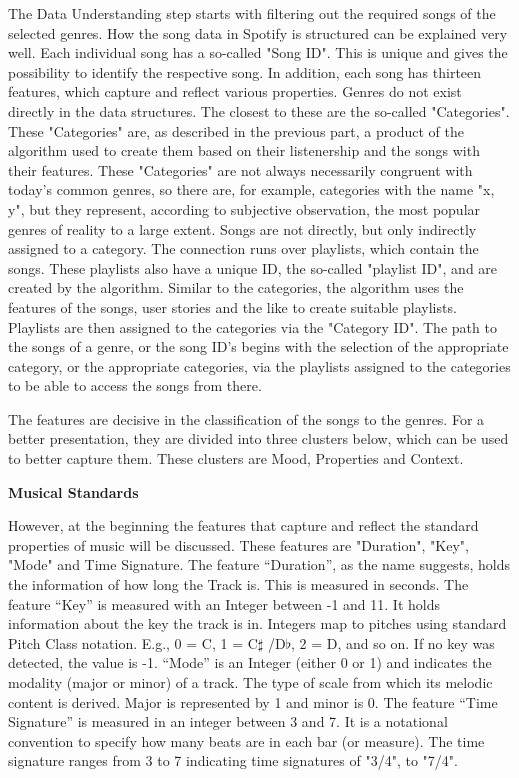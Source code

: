 The Data Understanding step starts with filtering out the required songs of the selected genres. 
How the song data in Spotify is structured can be explained very well.
Each individual song has a so-called "Song ID". 
This is unique and gives the possibility to identify the respective song.
In addition, each song has thirteen features, which capture and reflect various properties. 
Genres do not exist directly in the data structures. The closest to these are the so-called "Categories". 
These "Categories" are, as described in the previous part, a product of the algorithm used
to create them based on their listenership and the songs with their features. 
These "Categories" are not always necessarily congruent with today's common genres,
so there are, for example, categories with the name "x, y", but they represent, 
according to subjective observation, the most popular genres of reality to a large extent.
Songs are not directly, but only indirectly assigned to a category. 
The connection runs over playlists, which contain the songs.
These playlists also have a unique ID, the so-called "playlist ID", and are created by the algorithm. 
Similar to the categories, the algorithm uses the features of the songs,
user stories and the like to create suitable playlists. 
Playlists are then assigned to the categories via the "Category ID".
The path to the songs of a genre, or the song ID's begins with the selection of the appropriate category,
or the appropriate categories, via the playlists assigned to the categories
to be able to access the songs from there.

The features are decisive in the classification of the songs to the genres.
For a better presentation, they are divided into three clusters below, 
which can be used to better capture them. These clusters are Mood, Properties and Context.

\textbf{Musical Standards}

However, at the beginning the features that capture and reflect the standard properties of music will
be discussed. These features are "Duration", "Key", "Mode" and Time Signature. 
The feature “Duration”, as the name suggests, holds the information of how long the Track is.
This is measured in seconds. The feature “Key” is measured with an Integer between -1 and 11.
It holds information about the key the track is in. Integers map to pitches using
standard Pitch Class notation. 
E.g., 0 = C, 1 = C\(\sharp\) /D\(\flat\), 2 = D, and so on. If no key was detected, the value is -1. %
“Mode” is an Integer (either 0 or 1) and indicates the modality (major or minor) of a track. 
The type of scale from which its melodic content is derived. Major is represented by 1 and minor is 0. 
The feature “Time Signature” is measured in an integer between 3 and 7.
It is a notational convention to specify how many beats are in each bar (or measure). 
The time signature ranges from 3 to 7 indicating time signatures of "3/4", to "7/4".

